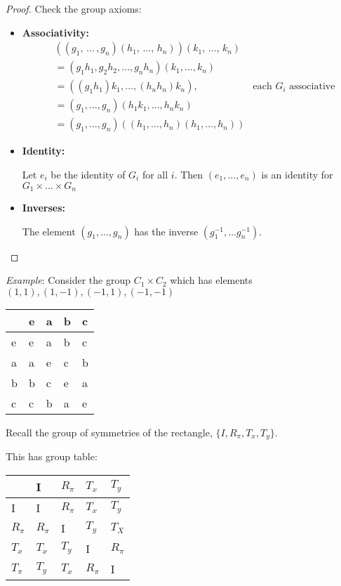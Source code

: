 \documentclass{article}
\theoremstyle{definition}
\begin{document}
\begin{proof}
Check the group axioms:
\begin{itemize}
  \item 
    \textbf{Associativity:}
  \begin{align*}
    & ((g_1, \, \ldots \, , g_n)(h_1,\, \ldots, \, h_n)) (k_1, \, \ldots , \, k_n) & \\
    &= (g_1 h_1, g_2 h_2, \ldots, g_n h_n) (k_1, \ldots , k_n) & \\
    &= ((g_1 h_1)k_1, \ldots , (h_n h_n)k_n), & 
      \text{each } G_i \text{ associative}\\
    &= (g_1, \ldots, g_n) (h_1 k_1, \ldots, h_n k_n) & \\
    &= (g_1, \ldots, g_n) ((h_1, \ldots, h_n) (h_1, \ldots, h_n)) &
  \end{align*}
\item
  \textbf{Identity:}

Let $e_i$ be the identity of $G_i$ for all $i$. Then $(e_1, \ldots, e_n)$ is an identity for $G_1 \times \ldots \times G_n$
\item
  \textbf{Inverses:}

The element $(g_1, \ldots , g_n)$ has the inverse $(g_1^{-1}, \ldots g_n^{-1})$.

\end{itemize}

\end{proof}
\emph{Example}: Consider the group $C_1 \times C_2$ which has elements $(1,1), (1,-1),(-1,1),(-1,-1)$

\begin{table}[]

\centering
\label{my-label}
\begin{tabular}{l|llll}
  & e & a & b & c \\ 
  \hline
e & e & a & b & c \\
a & a & e & c & b \\
b & b & c & e & a \\
c & c & b & a & e
\end{tabular}
\end{table}

Recall the group of symmetries of the rectangle, $\{I, R_\pi, T_x, T_y\}$.

This has group table:

\begin{table}[h]
\centering
\label{my-label}
\begin{tabular}{l|llll}
       & I      & $R_\pi$ & $T_x$   & $T_y$   \\
       \hline
I      & I      & $R_\pi$ & $T_x$   & $T_y$   \\
$R_\pi$ & $R_\pi$ & I      & $T_y$   & $T_X$    \\
$T_x$   & $T_x$   & $T_y$   & I      & $R_\pi$ \\
$T_\pi$ & $T_y$   & $T_x$   & $R_\pi$ & I     
\end{tabular}
\end{table}
\end{document}
